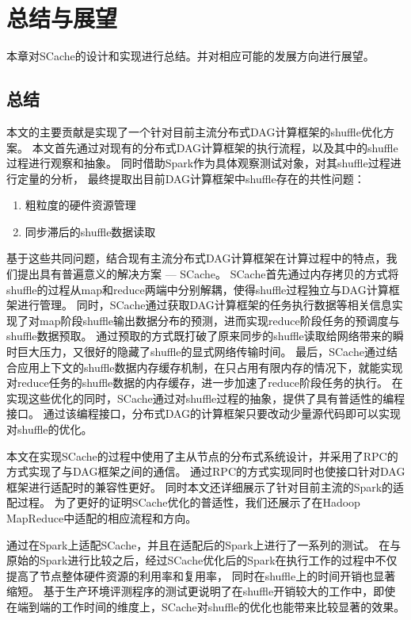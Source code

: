 
\chapter{总结与展望}
\label{chap:summary}

本章对SCache的设计和实现进行总结。并对相应可能的发展方向进行展望。

\section{总结}

本文的主要贡献是实现了一个针对目前主流分布式DAG计算框架的shuffle优化方案。
本文首先通过对现有的分布式DAG计算框架的执行流程，以及其中的shuffle过程进行观察和抽象。
同时借助Spark作为具体观察测试对象，对其shuffle过程进行定量的分析，
最终提取出目前DAG计算框架中shuffle存在的共性问题：
\begin{enumerate}
    \item 粗粒度的硬件资源管理
    \item 同步滞后的shuffle数据读取
\end{enumerate}
基于这些共同问题，结合现有主流分布式DAG计算框架在计算过程中的特点，我们提出具有普遍意义的解决方案 --- SCache。
SCache首先通过内存拷贝的方式将shuffle的过程从map和reduce两端中分别解耦，使得shuffle过程独立与DAG计算框架进行管理。
同时，SCache通过获取DAG计算框架的任务执行数据等相关信息实现了对map阶段shuffle输出数据分布的预测，进而实现reduce阶段任务的预调度与shuffle数据预取。
通过预取的方式既打破了原来同步的shuffle读取给网络带来的瞬时巨大压力，又很好的隐藏了shuffle的显式网络传输时间。
最后，SCache通过结合应用上下文的shuffle数据内存缓存机制，在只占用有限内存的情况下，就能实现对reduce任务的shuffle数据的内存缓存，进一步加速了reduce阶段任务的执行。
在实现这些优化的同时，SCache通过对shuffle过程的抽象，提供了具有普适性的编程接口。
通过该编程接口，分布式DAG的计算框架只要改动少量源代码即可以实现对shuffle的优化。

本文在实现SCache的过程中使用了主从节点的分布式系统设计，并采用了RPC的方式实现了与DAG框架之间的通信。
通过RPC的方式实现同时也使接口针对DAG框架进行适配时的兼容性更好。
同时本文还详细展示了针对目前主流的Spark的适配过程。
为了更好的证明SCache优化的普适性，我们还展示了在Hadoop MapReduce中适配的相应流程和方向。

通过在Spark上适配SCache，并且在适配后的Spark上进行了一系列的测试。
在与原始的Spark进行比较之后，经过SCache优化后的Spark在执行工作的过程中不仅提高了节点整体硬件资源的利用率和复用率，
同时在shuffle上的时间开销也显著缩短。
基于生产环境评测程序的测试更说明了在shuffle开销较大的工作中，即使在端到端的工作时间的维度上，SCache对shuffle的优化也能带来比较显著的效果。

